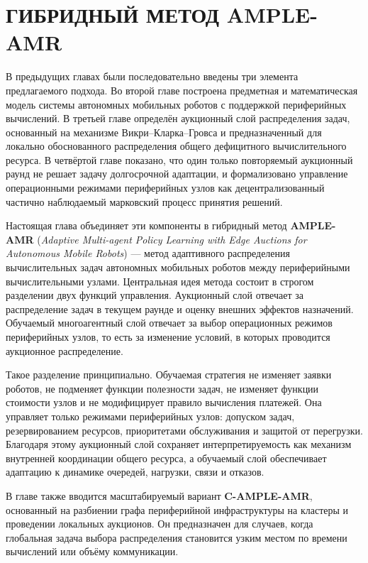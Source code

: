 \chapter{ГИБРИДНЫЙ МЕТОД AMPLE-AMR}\label{ch:ch5}

В предыдущих главах были последовательно введены три элемента предлагаемого подхода. Во второй главе построена предметная и математическая модель системы автономных мобильных роботов с поддержкой периферийных вычислений. В третьей главе определён аукционный слой распределения задач, основанный на механизме Викри--Кларка--Гровса и предназначенный для локально обоснованного распределения общего дефицитного вычислительного ресурса. В четвёртой главе показано, что один только повторяемый аукционный раунд не решает задачу долгосрочной адаптации, и формализовано управление операционными режимами периферийных узлов как децентрализованный частично наблюдаемый марковский процесс принятия решений.

Настоящая глава объединяет эти компоненты в гибридный метод \textbf{AMPLE-AMR} (\textit{Adaptive Multi-agent Policy Learning with Edge Auctions for Autonomous Mobile Robots}) --- метод адаптивного распределения вычислительных задач автономных мобильных роботов между периферийными вычислительными узлами. Центральная идея метода состоит в строгом разделении двух функций управления. Аукционный слой отвечает за распределение задач в текущем раунде и оценку внешних эффектов назначений. Обучаемый многоагентный слой отвечает за выбор операционных режимов периферийных узлов, то есть за изменение условий, в которых проводится аукционное распределение.

Такое разделение принципиально. Обучаемая стратегия не изменяет заявки роботов, не подменяет функции полезности задач, не изменяет функции стоимости узлов и не модифицирует правило вычисления платежей. Она управляет только режимами периферийных узлов: допуском задач, резервированием ресурсов, приоритетами обслуживания и защитой от перегрузки. Благодаря этому аукционный слой сохраняет интерпретируемость как механизм внутренней координации общего ресурса, а обучаемый слой обеспечивает адаптацию к динамике очередей, нагрузки, связи и отказов.

В главе также вводится масштабируемый вариант \textbf{C-AMPLE-AMR}, основанный на разбиении графа периферийной инфраструктуры на кластеры и проведении локальных аукционов. Он предназначен для случаев, когда глобальная задача выбора распределения становится узким местом по времени вычислений или объёму коммуникации.


